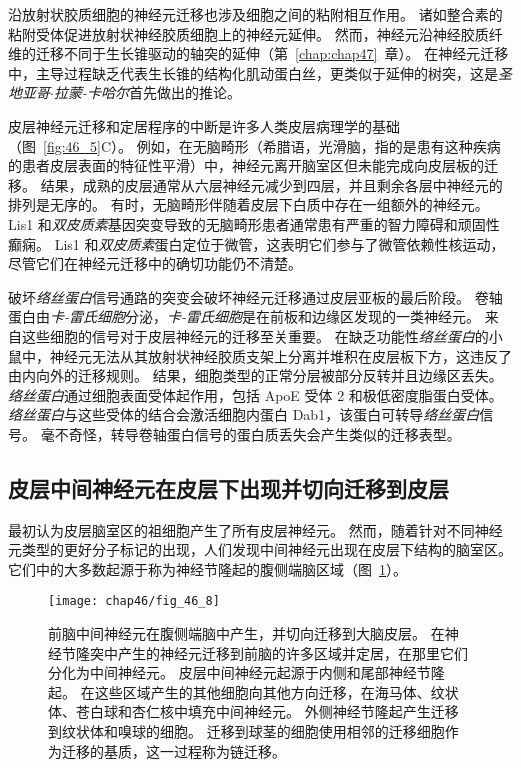 沿放射状胶质细胞的神经元迁移也涉及细胞之间的粘附相互作用。
诸如整合素的粘附受体促进放射状神经胶质细胞上的神经元延伸。
然而，神经元沿神经胶质纤维的迁移不同于生长锥驱动的轴突的延伸（第~\ref{chap:chap47}~章）。
在神经元迁移中，主导过程缺乏代表生长锥的结构化肌动蛋白丝，更类似于延伸的树突，这是\textit{圣地亚哥$\cdot$拉蒙-卡哈尔}首先做出的推论。


皮层神经元迁移和定居程序的中断是许多人类皮层病理学的基础（图~\ref{fig:46_5}C）。
例如，在无脑畸形（希腊语，光滑脑，指的是患有这种疾病的患者皮层表面的特征性平滑）中，神经元离开脑室区但未能完成向皮层板的迁移。
结果，成熟的皮层通常从六层神经元减少到四层，并且剩余各层中神经元的排列是无序的。 
有时，无脑畸形伴随着皮层下白质中存在一组额外的神经元。
Lis1 和\textit{双皮质素}基因突变导致的无脑畸形患者通常患有严重的智力障碍和顽固性癫痫。
Lis1 和\textit{双皮质素}蛋白定位于微管，这表明它们参与了微管依赖性核运动，尽管它们在神经元迁移中的确切功能仍不清楚。


破坏\textit{络丝蛋白}信号通路的突变会破坏神经元迁移通过皮层亚板的最后阶段。
卷轴蛋白由\textit{卡-雷氏细胞}分泌，\textit{卡-雷氏细胞}是在前板和边缘区发现的一类神经元。
来自这些细胞的信号对于皮层神经元的迁移至关重要。
在缺乏功能性\textit{络丝蛋白}的小鼠中，神经元无法从其放射状神经胶质支架上分离并堆积在皮层板下方，这违反了由内向外的迁移规则。
结果，细胞类型的正常分层被部分反转并且边缘区丢失。
\textit{络丝蛋白}通过细胞表面受体起作用，包括 ApoE 受体 2 和极低密度脂蛋白受体。
\textit{络丝蛋白}与这些受体的结合会激活细胞内蛋白 Dab1，该蛋白可转导\textit{络丝蛋白}信号。
毫不奇怪，转导卷轴蛋白信号的蛋白质丢失会产生类似的迁移表型。



\subsection{皮层中间神经元在皮层下出现并切向迁移到皮层}

最初认为皮层脑室区的祖细胞产生了所有皮层神经元。
然而，随着针对不同神经元类型的更好分子标记的出现，人们发现中间神经元出现在皮层下结构的脑室区。
它们中的大多数起源于称为神经节隆起的腹侧端脑区域（图~\ref{fig:46_8}）。


\begin{figure}[htbp]
	\centering
	\texttt{[image: chap46/fig\_46\_8]}
	\caption{前脑中间神经元在腹侧端脑中产生，并切向迁移到大脑皮层。
		在神经节隆突中产生的神经元迁移到前脑的许多区域并定居，在那里它们分化为中间神经元。
		皮层中间神经元起源于内侧和尾部神经节隆起。
		在这些区域产生的其他细胞向其他方向迁移，在海马体、纹状体、苍白球和杏仁核中填充中间神经元。
		外侧神经节隆起产生迁移到纹状体和嗅球的细胞。
		迁移到球茎的细胞使用相邻的迁移细胞作为迁移的基质，这一过程称为链迁移\cite{bandler2017cortical}。}
	\label{fig:46_8}
\end{figure}


